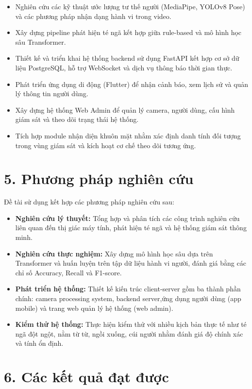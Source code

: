 \begin{itemize}
    \item Nghiên cứu các kỹ thuật ước lượng tư thế người (MediaPipe, YOLOv8 Pose) và các phương pháp nhận dạng hành vi trong video.
    \item Xây dựng pipeline phát hiện té ngã kết hợp giữa rule-based và mô hình học sâu Transformer.
    \item Thiết kế và triển khai hệ thống backend sử dụng FastAPI kết hợp cơ sở dữ liệu PostgreSQL, hỗ trợ WebSocket và dịch vụ thông báo thời gian thực.
    \item Phát triển ứng dụng di động (Flutter) để nhận cảnh báo, xem lịch sử và quản lý thông tin người dùng.
    \item Xây dựng hệ thống Web Admin để quản lý camera, người dùng, cấu hình giám sát và theo dõi trạng thái hệ thống.
    \item Tích hợp module nhận diện khuôn mặt nhằm xác định danh tính đối tượng trong vùng giám sát và kích hoạt cơ chế theo dõi tương ứng.
\end{itemize}

\section*{5. Phương pháp nghiên cứu}

Đề tài sử dụng kết hợp các phương pháp nghiên cứu sau:

\begin{itemize}
    \item \textbf{Nghiên cứu lý thuyết:} Tổng hợp và phân tích các công trình nghiên cứu liên quan đến thị giác máy tính, phát hiện té ngã và hệ thống giám sát thông minh.
    \item \textbf{Nghiên cứu thực nghiệm:} Xây dựng mô hình học sâu dựa trên Transformer và huấn luyện trên tập dữ liệu hành vi người, đánh giá bằng các chỉ số Accuracy, Recall và F1-score.
    \item \textbf{Phát triển hệ thống:} Thiết kế kiến trúc client-server gồm ba thành phần chính: camera processing system, backend server,ứng dụng người dùng (app mobile) và trang web quản lý hệ thống (web admin).
    \item \textbf{Kiểm thử hệ thống:} Thực hiện kiểm thử với nhiều kịch bản thực tế như té ngã đột ngột, nằm từ từ, ngồi xuống, cúi người nhằm đánh giá độ chính xác và tính ổn định.
\end{itemize}

\section*{6. Các kết quả đạt được}

